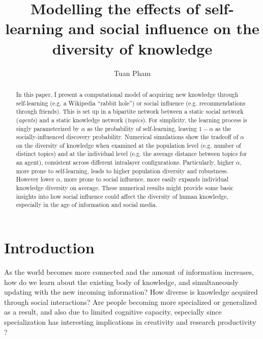 \documentclass{svproc}
\begin{document}
\mainmatter
\title{Modelling the effects of self-learning and social influence on the diversity of knowledge}


\author{Tuan Pham}

\maketitle

\begin{abstract}
    In this paper, I present a computational model of acquiring new knowledge through self-learning (e.g. a Wikipedia ``rabbit hole'') or social influence (e.g. recommendations through friends). This is set up in a bipartite network between a static social network (\textit{agents}) and a static knowledge network (\textit{topics}). For simplicity, the learning process is singly parameterized by $\alpha$ as the probability of self-learning, leaving $1-\alpha$ as the socially-influenced discovery probability. Numerical simulations show the tradeoff of $\alpha$ on the diversity of knowledge when examined at the population level (e.g. number of distinct topics) and at the individual level (e.g. the average distance between topics for an agent), consistent across different intralayer configurations. Particularly, higher $\alpha$, more prone to self-learning, leads to higher population diversity and robustness. However lower $\alpha$, more prone to social influence, more easily expands individual knowledge diversity on average. These numerical results might provide some basic insights into how social influence could affect the diversity of human knowledge, especially in the age of information and social media.
\end{abstract}

\section{Introduction} \label{sec:intro}

As the world becomes more connected and the amount of information increases, how do we learn about the existing body of knowledge, and simultaneously updating with the new incoming information? How diverse is knowledge acquired through social interactions? Are people becoming more specialized or generalized as a result, and also due to limited cognitive capacity, especially since specialization has interesting implications in creativity and research productivity \cite{Teodoridis2019-tc}?
\end{document}
